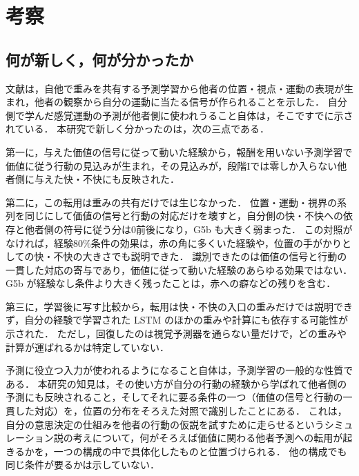 \section{考察}\label{sec:discussion}

\subsection{何が新しく，何が分かったか}\label{sec:disc-what}
文献\cite{noguchi2022superposition}は，自他で重みを共有する予測学習から他者の位置・視点・運動の表現が生まれ，他者の観察から自分の運動に当たる信号が作られることを示した．
自分側で学んだ感覚運動の予測が他者側に使われうること自体は，そこですでに示されている．
本研究で新しく分かったのは，次の三点である．

第一に，与えた価値の信号に従って動いた経験から，報酬を用いない予測学習で価値に従う行動の見込みが生まれ，その見込みが，段階Iでは零しか入らない他者側に与えた快・不快にも反映された．

第二に，この転用は重みの共有だけでは生じなかった．
位置・運動・視界の系列を同じにして価値の信号と行動の対応だけを壊すと，自分側の快・不快への依存と他者側の符号に従う分は0前後になり，G5b も大きく弱まった．
この対照がなければ，経験80\%条件の効果は，赤の角に多くいた経験や，位置の手がかりとしての快・不快の大きさでも説明できた．
識別できたのは価値の信号と行動の一貫した対応の寄与であり，価値に従って動いた経験のあらゆる効果ではない．
G5b が経験なし条件より大きく残ったことは，赤への癖などの残りを含む．

第三に，学習後に写す比較から，転用は快・不快の入口の重みだけでは説明できず，自分の経験で学習された LSTM のほかの重みや計算にも依存する可能性が示された．
ただし，回復したのは視覚予測器を通らない量だけで，どの重みや計算が運ばれるかは特定していない．

予測に役立つ入力が使われるようになること自体は，予測学習の一般的な性質である．
本研究の知見は，その使い方が自分の行動の経験から学ばれて他者側の予測にも反映されること，そしてそれに要る条件の一つ（価値の信号と行動の一貫した対応）を，位置の分布をそろえた対照で識別したことにある．
これは，自分の意思決定の仕組みを他者の行動の仮説を試すために走らせるというシミュレーション説の考え\cite{gordon2021simulation}について，何がそろえば価値に関わる他者予測への転用が起きるかを，一つの構成の中で具体化したものと位置づけられる．
他の構成でも同じ条件が要るかは示していない．

